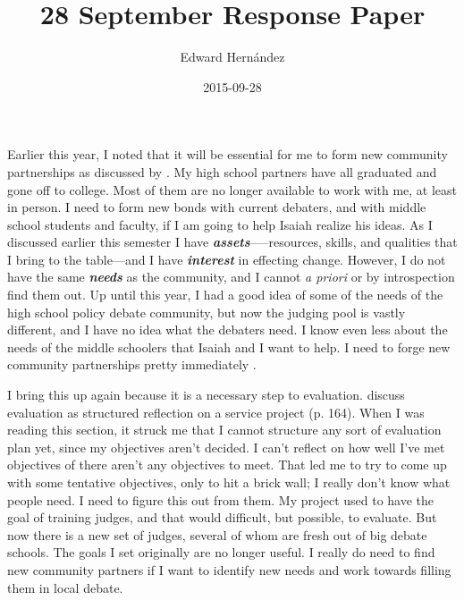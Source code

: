 \documentclass[man,12pt]{apa6}
\begin{document}
\title{28 September Response Paper}
\author{Edward Hern\'{a}ndez}
\date{2015-09-28}
\maketitle

Earlier this year, I noted that it will be essential for me to form new
community partnerships as discussed by \citet{Cress13}. 
My high school partners have all graduated and gone off to college. Most of
them are no longer available to work with me, at least in person.  I need to
form new bonds with current debaters, and with middle school students and
faculty, if I am going to help Isaiah realize his ideas. As I discussed earlier
this semester I have \textit{\textbf{assets}}—--resources, skills, and
qualities that I bring to the table—and I have \textit{\textbf{interest}} in
effecting change. However, I do not have the same \textit{\textbf{needs}} as
the community, and I cannot \emph{a priori} or by introspection find them out.
Up until this year, I had a good idea of some of the needs of the high school
policy debate community, but now the judging pool is vastly different, and I
have no idea what the debaters need. 
I know even less about the needs of the middle schoolers that Isaiah and I want
to help. I need to forge new community partnerships pretty immediately
\cite{Cress13}.

I bring this up again because it is a necessary step to evaluation.
\citet{Cress13} discuss evaluation as structured reflection on a service
project (p. 164). When I was reading this section, it struck me that I cannot
structure any sort of evaluation plan yet, since my objectives aren't decided.
I can't reflect on how well I've met objectives of there aren't any objectives
to meet. That led me to try to come up with some tentative objectives, only to
hit a brick wall; I really don't know what people need. 
I need to figure this out from them. My project used to have the goal of
training judges, and that would difficult, but possible, to evaluate.  But now
there is a new set of judges, several of whom are fresh out of big debate
schools. The goals I set originally are no longer useful. I really do need to
find new community partners if I want to identify new needs and work towards
filling them in local debate.
\end{document}
